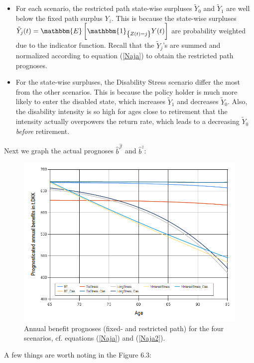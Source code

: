 \documentclass{article}
\newcommand{\1}[1]{\mathbbm{1}_{\left\lbrace #1 \right\rbrace}}
\newcommand{\expec}[1][def]{\mathbbm{E} \left[ #1 \right]}
\theoremstyle{break}
\theoremstyle{remark}
\numberwithin{equation}{section}
\begin{document}
\begin{itemize}
	\item For each scenario, the restricted path state-wise surpluses $\tilde{Y}_0$ and $\tilde{Y}_1$ are well below the fixed path surplus $Y_z$. This is because the state-wise surpluses $\tilde{Y}_j(t) = \expec[\1{Z(t)=j}Y(t)]$ are probability weighted due to the indicator function. Recall that the $\tilde{Y}_j$'s are summed and normalized according to equation (\ref{Naja}) to obtain the restricted path prognoses.
	\item For the state-wise surpluses, the Disability Stress scenario differ the most from the other scenarios. This is because the policy holder is much more likely to enter the disabled state, which increases $\tilde{Y}_1$ and decreases $\tilde{Y}_0$. Also, the disability intensity is so high for ages close to retirement that the intensity actually overpowers the return rate, which leads to a decreasing $\tilde{Y}_0$ \textit{before} retirement.
\end{itemize}

Next we graph the actual prognoses $\hat{b}^{\hat{\mathcal{J}}}$ and $\hat{b}^z$:

\begin{figure}[H] \label{FigureBens}
	\centering
	\caption{Annual benefit prognoses (fixed- and restricted path) for the four scenarios, cf. equations (\ref{Naja}) and (\ref{Naja2}).}
	\includegraphics[width=\textwidth]{Benefits}
\end{figure}

A few things are worth noting in the Figure 6.3:
\end{document}
